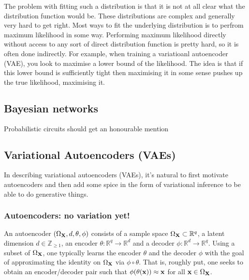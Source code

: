 \documentclass[11pt]{article}
\begin{document}
The problem with fitting such a distribution is that it is not at all clear what the distribution function would be. These distributions are complex and generally very hard to get right. Most ways to fit the underlying distribution is to perfrom maximum likelihood in some way. Performing maximum likelihood directly without access to any sort of direct distribution function is pretty hard, so it is often done indirectly. For example, when training a variatioanl autoencoder (VAE), you look to maximise a lower bound of the likelihood. The idea is that if this lower bound is sufficiently tight then maximising it in some sense pushes up the true likelihood, maximising it.

\subsection{\TODO{ }Bayesian networks}
Probabilistic circuits should get an honourable mention

\subsection{Variational Autoencoders (VAEs)}
 In describing variational autoencoders (VAEs), it's natural to first motivate autoencoders and then add some spice in the form of variational inference to be able to do generative things.

\subsubsection{Autoencoders: no variation yet!}
\label{sec:autoencoders}
An autoencoder $(\Omega_{\mathbf{X}},d,\theta,\phi)$ consists of a sample space $\Omega_{\mathbf{X}}\subset\mathbb{R}^q$, a latent dimension $d\in\mathbb{Z}_{\geq1}$, an encoder $\theta:\mathbb{R}^q\to\mathbb{R}^d$ and a decoder $\phi:\mathbb{R}^d\to\mathbb{R}^q$. Using a subset of $\Omega_{\mathbf{X}}$, one typically learns the encoder $\theta$ and the decoder $\phi$ with the goal of approximating the identity on $\Omega_{\mathbf{X}}$ via $\phi\circ \theta$. That is, roughly put, one seeks to obtain an encoder/decoder pair such that $\phi(\theta(\mathbf{x}))\approx\mathbf{x}$ for all $\mathbf{x}\in\Omega_{\mathbf{X}}$.
\end{document}
